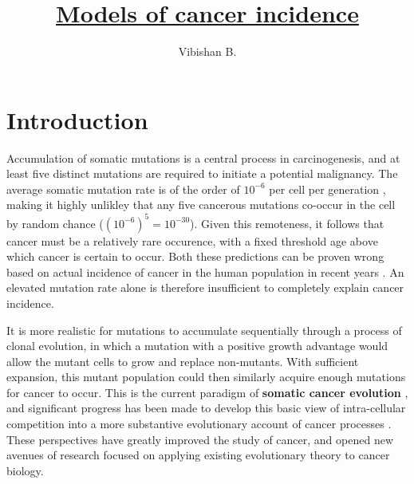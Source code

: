 \documentclass[12pt, onecolumn]{article}
\title{\underline{Models of cancer incidence}}
\author{Vibishan B.}
\begin{document}
	\maketitle
	\section{Introduction}
	
	Accumulation of somatic mutations is a central process in carcinogenesis, and at least five distinct mutations are required to initiate a potential malignancy. The average somatic mutation rate is of the order of $10^{-6}$ per cell per generation \cite{Tomasetti2015,Lynch2010,Seshadri1987}, making it highly unlikley that any five cancerous mutations co-occur in the cell by random chance ($(10^{-6})^5 = 10^{-30}$). Given this remoteness, it follows that cancer must be a relatively rare occurence, with a fixed threshold age above which cancer is certain to occur. Both these predictions can be proven wrong based on actual incidence of cancer in the human population in recent years \cite{AmericanCancerSociety2016}. An elevated mutation rate alone is therefore insufficient to completely explain cancer incidence. 
	
	It is more realistic for mutations to accumulate sequentially through a process of clonal evolution, in which a mutation with a positive growth advantage would allow the mutant cells to grow and replace non-mutants. With sufficient expansion, this mutant population could then similarly acquire enough mutations for cancer to occur. This is the current paradigm of \textbf{somatic cancer evolution} \cite{Nowell1976}, and significant progress has been made to develop this basic view of intra-cellular competition into a more substantive evolutionary account of cancer processes \cite{Aktipis2013,Aktipis2013a,Gerlinger2014}. These perspectives have greatly improved the study of cancer, and opened new avenues of research focused on applying existing evolutionary theory to cancer biology. %
	
\end{document}
